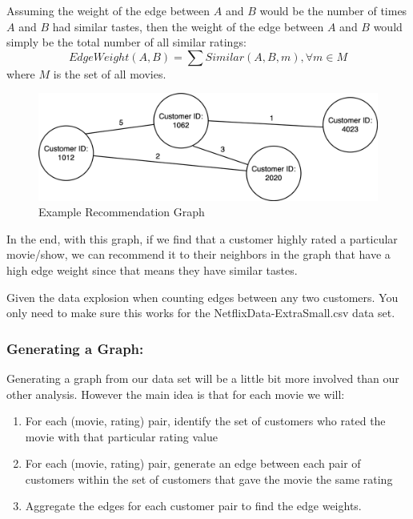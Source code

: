 \documentclass{article}
\begin{document}
\noindent Assuming the weight of the edge between $A$ and $B$ would be the number of times $A$ and $B$ had similar tastes, then the weight of the edge between $A$ and $B$ would simply be the total number of all similar ratings:
\vspace{0.1cm}
$$EdgeWeight(A,B) = \sum Similar(A,B,m), \forall m \in M$$
\vspace{0.1cm}
where $M$ is the set of all movies.\\

\begin{figure}[hbt!]
\vspace{-0.0cm}
\centering
\includegraphics[width=12cm]{images/recgraph.png}
\vspace{-0.0cm}
\caption{Example Recommendation Graph}
\label{fig:recgraph}
\end{figure}



\noindent In the end, with this graph, if we find that a customer highly rated a particular movie/show, we can recommend it to their neighbors in the graph that have a high edge weight since that means they have similar tastes. 

\begin{info}
Given the data explosion when counting edges between any two customers. You only need to make sure this works for the NetflixData-ExtraSmall.csv data set. 
\end{info}

\subsubsection*{Generating a Graph:}
Generating a graph from our data set will be a little bit more involved than our other analysis. However the main idea is that for each movie we will:
\begin{enumerate}
    \item For each (movie, rating) pair, identify the set of customers who rated the movie with that particular rating value \vspace{-0.2cm}
    \item For each (movie, rating) pair, generate an edge between each pair of customers within the set of customers that gave the movie the same rating \vspace{-0.2cm}
    \item Aggregate the edges for each customer pair to find the edge weights. \vspace{-0.3cm}
\end{enumerate}
\end{document}
